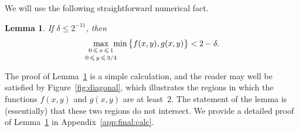 \documentclass[12pt,reqno]{amsart}
\newtheorem{lemma}[theorem]{Lemma}
\theoremstyle{definition}
\theoremstyle{remark}
\renewcommand{\le}{\leqslant}
\begin{document}

 We will use the following straightforward numerical fact.
 
\begin{lemma}\label{lem:final:calc}
If $\delta \le 2^{-11}$, then  
$$\max_{\substack{\\[-0.05ex] 0 \,\le\, x \,\le\, 1 \\[+0.3ex] 0 \,\le\, y \,\le\, 3/4}} \hspace{-0.2cm} \min \big\{ f(x,y),g(x,y) \big\} < 2 - \delta.$$
\end{lemma}

The proof of Lemma~\ref{lem:final:calc} is a simple calculation, and the reader may well be satisfied by Figure~\ref{fig:diagonal}, which illustrates the regions in which the functions $f(x,y)$ and $g(x,y)$ are at least~$2$. The statement of the lemma is (essentially) that these two regions do not intersect. We provide a detailed proof of Lemma~\ref{lem:final:calc} in Appendix~\ref{app:final:calc}. 

\pagebreak
\end{document}
